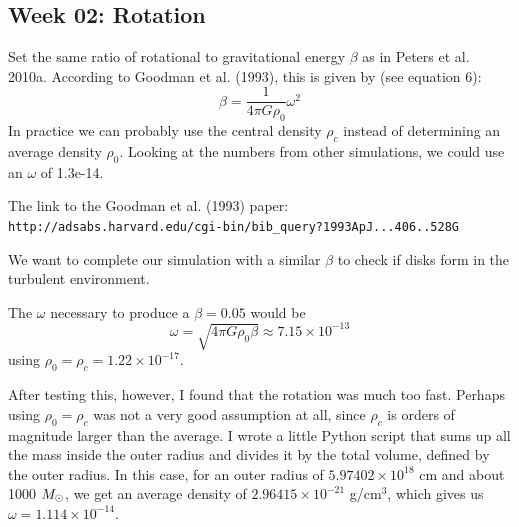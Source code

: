 \subsection*{Week 02: Rotation}

Set the same ratio of rotational to gravitational energy $\beta$ as in Peters et al. 2010a. According to Goodman et al. (1993)\supercite{goodman1993}, this is given by (see equation 6):
\begin{equation}
\beta = \frac{1}{4 \pi G \rho_0} \omega^2
\end{equation}
In practice we can probably use the central density $\rho_c$ instead of determining an average density $\rho_0$. Looking at the numbers from other simulations, we could use an $\omega$ of 1.3e-14.

The link to the Goodman et al. (1993) paper:\\
{\tt http://adsabs.harvard.edu/cgi-bin/bib\_query?1993ApJ...406..528G}

We want to complete our simulation with a similar $\beta$ to check if disks form in the turbulent environment.

The $\omega$ necessary to produce a $\beta = 0.05$ would be
\begin{equation}
\omega = \sqrt{4 \pi G \rho_0 \beta} \approx 7.15\times 10^{-13}
\end{equation}
using $\rho_0 = \rho_c = 1.22\times10^{-17}$.

After testing this, however, I found that the rotation was much too fast. Perhaps using $\rho_0 = \rho_c$ was not a very good assumption at all, since $\rho_c$ is orders of magnitude larger than the average. I wrote a little Python script that sums up all the mass inside the outer radius and divides it by the total volume, defined by the outer radius. In this case, for an outer radius of $5.97402\times 10^{18}$ cm and about 1000 $M_\odot$, we get an average density of $2.96415\times 10^{-21}$ g/cm$^3$, which gives us $\omega = 1.114 \times 10^{-14}$.
